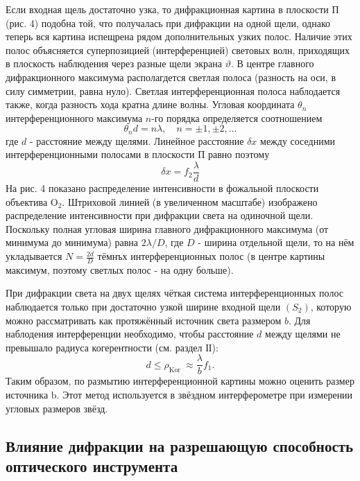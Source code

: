 \documentclass[a4paper, 12pt]{article}
\begin{document}
Если входная щель достаточно узка, то дифракционная картина в плоскости П (рис. 4) подобна той, что получалась при дифракции на одной щели, однако теперь вся картина
испещрена рядом дополнительных узких полос. Наличие этих полос объясняется суперпозицией (интерференцией) световых волн, приходящих в плоскость наблюдения через разные щели экрана $\vartheta$. В центре главного дифракционного максимума располагдется светлая полоса (разность на оси, в силу симметрии, равна нуло). Светлая интерференционная полоса наблодается также, когда разность хода кратна длине волны. Угловая координата $\theta_n$ интерференционного максимума $n$-го порядка определяется соотношением
\begin{equation*}
\theta_n d=n \lambda, \quad n= \pm 1, \pm 2, \ldots
\end{equation*}
где $d$ - расстояние между щелями. Линейное расстояние $\delta x$ между соседними интерференционными полосами в плоскости П равно поэтому
\begin{equation*}
\delta x=f_2 \frac{\lambda}{d}
\end{equation*}
На рис. 4 показано распределение интенсивности в фожальной плоскости объектива $\mathrm{O}_2$. Штриховой линией (в увеличенном масштабе) изображено распределение интенсивности при дифракции света на одиночной щели. Поскольку полная угловая ширина главного дифракционного максимума (от минимума до минимума) равна $2 \lambda / D$, где $D$ - ширина отдельной щели, то на нём укладывается $N=\frac{2 d}{D}$ тёмнъх интерференционных полос (в центре картины максимум, поэтому светлых полос - на одну больше).

При дифракции света на двух щелях чёткая система интерференционных полос наблюдается только при достаточно узкой ширине входной щели $\left(S_2\right)$, которую можно рассматривать как протяжённый источник света размером $b$. Для наблодения интерференции необходимо, чтобы расстояние $d$ между щелями не превышало радиуса когерентности (см. раздел ІІ):
\begin{equation*}
d \leqslant \rho_{\text {Kor }} \approx \frac{\lambda}{b} f_1 .
\end{equation*}
Таким образом, по размытию интерференционной картины можно оценить размер источника b. Этот метод используется в звёздном интерферометре при измерении угловых размеров звёзд.

\subsection*{Влияние дифракции на разрешающую способность оптического инструмента}
\end{document}
